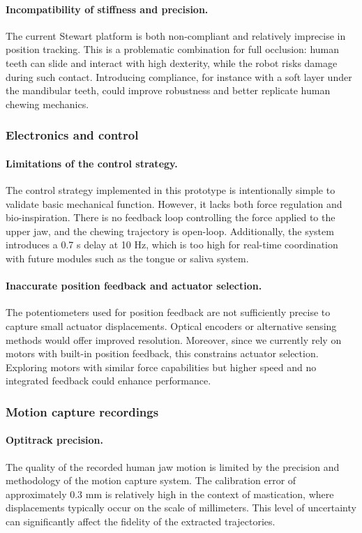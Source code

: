 \paragraph{Incompatibility of stiffness and precision.}
The current Stewart platform is both non-compliant and relatively imprecise in position tracking. This is a problematic combination for full occlusion: human teeth 
can slide and interact with high dexterity, while the robot risks damage during such contact. Introducing compliance, for instance with a soft layer under the mandibular 
teeth, could improve robustness and better replicate human chewing mechanics.

\subsubsection{Electronics and control}
\paragraph{Limitations of the control strategy.}
The control strategy implemented in this prototype is intentionally simple to validate basic mechanical function. However, it lacks both force regulation and 
bio-inspiration. There is no feedback loop controlling the force applied to the upper jaw, and the chewing trajectory is open-loop. Additionally, the system 
introduces a 0.7 s delay at 10 Hz, which is too high for real-time coordination with future modules such as the tongue or saliva system.

\paragraph{Inaccurate position feedback and actuator selection.}
The potentiometers used for position feedback are not sufficiently precise to capture small actuator displacements. Optical encoders or alternative sensing methods 
would offer improved resolution. Moreover, since we currently rely on motors with built-in position feedback, this constrains actuator selection. Exploring motors 
with similar force capabilities but higher speed and no integrated feedback could enhance performance.

\subsubsection{Motion capture recordings}

\paragraph{Optitrack precision.}The quality of the recorded human jaw motion is limited by the precision and methodology of the motion capture system. The calibration error of approximately $0.3$ mm is 
relatively high in the context of mastication, where displacements typically occur on the scale of millimeters. This level of uncertainty can significantly 
affect the fidelity of the extracted trajectories.

